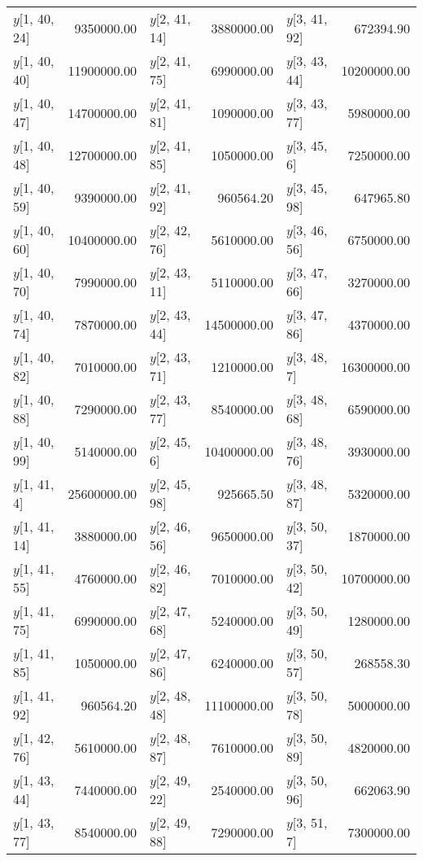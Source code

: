 \begin{longtable}{lrlrlr}
$y$[1, 40, 24] & 9350000.00 & $y$[2, 41, 14] & 3880000.00 & $y$[3, 41, 92] & 672394.90 \\
$y$[1, 40, 40] & 11900000.00 & $y$[2, 41, 75] & 6990000.00 & $y$[3, 43, 44] & 10200000.00 \\
$y$[1, 40, 47] & 14700000.00 & $y$[2, 41, 81] & 1090000.00 & $y$[3, 43, 77] & 5980000.00 \\
$y$[1, 40, 48] & 12700000.00 & $y$[2, 41, 85] & 1050000.00 & $y$[3, 45, 6] & 7250000.00 \\
$y$[1, 40, 59] & 9390000.00 & $y$[2, 41, 92] & 960564.20 & $y$[3, 45, 98] & 647965.80 \\
$y$[1, 40, 60] & 10400000.00 & $y$[2, 42, 76] & 5610000.00 & $y$[3, 46, 56] & 6750000.00 \\
$y$[1, 40, 70] & 7990000.00 & $y$[2, 43, 11] & 5110000.00 & $y$[3, 47, 66] & 3270000.00 \\
$y$[1, 40, 74] & 7870000.00 & $y$[2, 43, 44] & 14500000.00 & $y$[3, 47, 86] & 4370000.00 \\
$y$[1, 40, 82] & 7010000.00 & $y$[2, 43, 71] & 1210000.00 & $y$[3, 48, 7] & 16300000.00 \\
$y$[1, 40, 88] & 7290000.00 & $y$[2, 43, 77] & 8540000.00 & $y$[3, 48, 68] & 6590000.00 \\
$y$[1, 40, 99] & 5140000.00 & $y$[2, 45, 6] & 10400000.00 & $y$[3, 48, 76] & 3930000.00 \\
$y$[1, 41, 4] & 25600000.00 & $y$[2, 45, 98] & 925665.50 & $y$[3, 48, 87] & 5320000.00 \\
$y$[1, 41, 14] & 3880000.00 & $y$[2, 46, 56] & 9650000.00 & $y$[3, 50, 37] & 1870000.00 \\
$y$[1, 41, 55] & 4760000.00 & $y$[2, 46, 82] & 7010000.00 & $y$[3, 50, 42] & 10700000.00 \\
$y$[1, 41, 75] & 6990000.00 & $y$[2, 47, 68] & 5240000.00 & $y$[3, 50, 49] & 1280000.00 \\
$y$[1, 41, 85] & 1050000.00 & $y$[2, 47, 86] & 6240000.00 & $y$[3, 50, 57] & 268558.30 \\
$y$[1, 41, 92] & 960564.20 & $y$[2, 48, 48] & 11100000.00 & $y$[3, 50, 78] & 5000000.00 \\
$y$[1, 42, 76] & 5610000.00 & $y$[2, 48, 87] & 7610000.00 & $y$[3, 50, 89] & 4820000.00 \\
$y$[1, 43, 44] & 7440000.00 & $y$[2, 49, 22] & 2540000.00 & $y$[3, 50, 96] & 662063.90 \\
$y$[1, 43, 77] & 8540000.00 & $y$[2, 49, 88] & 7290000.00 & $y$[3, 51, 7] & 7300000.00 \\

\end{longtable}
